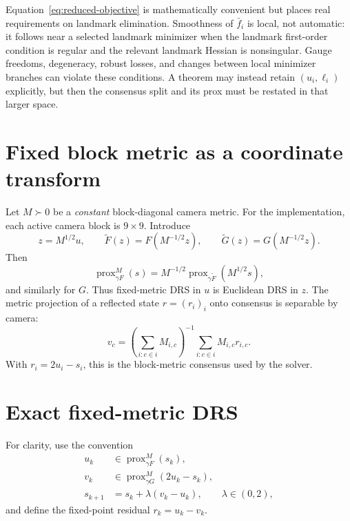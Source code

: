 \documentclass[11pt]{article}
\begin{document}
Equation~\eqref{eq:reduced-objective} is mathematically convenient but places
real requirements on landmark elimination.  Smoothness of $\bar f_i$ is local,
not automatic: it follows near a selected landmark minimizer when the landmark
first-order condition is regular and the relevant landmark Hessian is
nonsingular.  Gauge freedoms, degeneracy, robust losses, and changes between
local minimizer branches can violate these conditions.  A theorem may instead
retain $(u_i,\ell_i)$ explicitly, but then the consensus split and its prox must
be restated in that larger space.

\section{Fixed block metric as a coordinate transform}

Let $M\succ0$ be a \emph{constant} block-diagonal camera metric.  For the
implementation, each active camera block is $9\times9$.  Introduce
\begin{equation}
  z=M^{1/2}u,
  \qquad
  \widetilde F(z)=F(M^{-1/2}z),
  \qquad
  \widetilde G(z)=G(M^{-1/2}z).
  \label{eq:metric-transform}
\end{equation}
Then
\begin{equation}
  \operatorname{prox}^{M}_{\gamma F}(s)
  =M^{-1/2}\operatorname{prox}_{\gamma\widetilde F}(M^{1/2}s),
\end{equation}
and similarly for $G$.  Thus fixed-metric DRS in $u$ is Euclidean DRS in
$z$.  The metric projection of a reflected state $r=(r_i)_i$ onto consensus
is separable by camera:
\begin{equation}
  v_c=
  \left(\sum_{i:c\in i}M_{i,c}\right)^{-1}
  \sum_{i:c\in i}M_{i,c}r_{i,c}.
  \label{eq:metric-consensus}
\end{equation}
With $r_i=2u_i-s_i$, this is the block-metric consensus used by the solver.

\section{Exact fixed-metric DRS}

For clarity, use the convention
\begin{align}
  u_k &\in \operatorname{prox}^{M}_{\gamma F}(s_k),
  \\
  v_k &\in \operatorname{prox}^{M}_{\gamma G}(2u_k-s_k),
  \\
  s_{k+1} &= s_k+\lambda(v_k-u_k),
  \qquad \lambda\in(0,2),
  \label{eq:exact-drs}
\end{align}
and define the fixed-point residual $r_k=u_k-v_k$.
\end{document}
